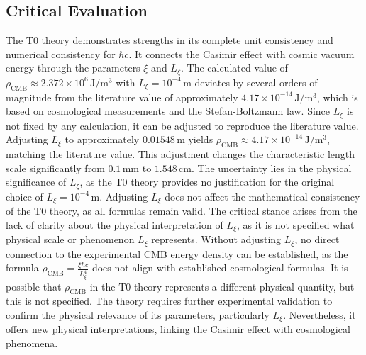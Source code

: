 \documentclass{article}
\begin{document}
	\subsection{Critical Evaluation}
	The T0 theory demonstrates strengths in its complete unit consistency and numerical consistency for $\hbar c$. It connects the Casimir effect with cosmic vacuum energy through the parameters $\xi$ and $L_\xi$. The calculated value of $\rho_{\text{CMB}} \approx 2.372 \times 10^6 \, \text{J}/\text{m}^3$ with $L_\xi = 10^{-4} \, \text{m}$ deviates by several orders of magnitude from the literature value of approximately $4.17 \times 10^{-14} \, \text{J}/\text{m}^3$, which is based on cosmological measurements and the Stefan-Boltzmann law. Since $L_\xi$ is not fixed by any calculation, it can be adjusted to reproduce the literature value. Adjusting $L_\xi$ to approximately $0.01548 \, \text{m}$ yields $\rho_{\text{CMB}} \approx 4.17 \times 10^{-14} \, \text{J}/\text{m}^3$, matching the literature value. This adjustment changes the characteristic length scale significantly from $0.1 \, \text{mm}$ to $1.548 \, \text{cm}$. The uncertainty lies in the physical significance of $L_\xi$, as the T0 theory provides no justification for the original choice of $L_\xi = 10^{-4} \, \text{m}$. Adjusting $L_\xi$ does not affect the mathematical consistency of the T0 theory, as all formulas remain valid. The critical stance arises from the lack of clarity about the physical interpretation of $L_\xi$, as it is not specified what physical scale or phenomenon $L_\xi$ represents. Without adjusting $L_\xi$, no direct connection to the experimental CMB energy density can be established, as the formula $\rho_{\text{CMB}} = \frac{\xi \hbar c}{L_\xi^4}$ does not align with established cosmological formulas. It is possible that $\rho_{\text{CMB}}$ in the T0 theory represents a different physical quantity, but this is not specified. The theory requires further experimental validation to confirm the physical relevance of its parameters, particularly $L_\xi$. Nevertheless, it offers new physical interpretations, linking the Casimir effect with cosmological phenomena.
	
\end{document}

